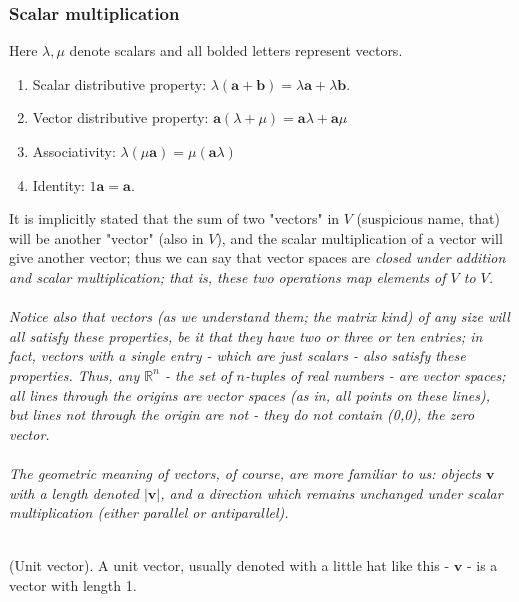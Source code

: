 \documentclass{article}
\begin{document}
\subsubsection*{Scalar multiplication}
Here $\lambda, \mu$ denote scalars and all bolded letters represent vectors.
\begin{enumerate}
    \item Scalar distributive property: $\lambda\mathbf{(a+b)}=\lambda\mathbf{a}+\lambda\mathbf{b}$.
    \item Vector distributive property: $\mathbf{a}(\lambda+\mu)=\mathbf{a}\lambda+\mathbf{a}\mu$
    \item Associativity: $\lambda(\mu\mathbf{a})=\mu(\mathbf{a}\lambda)$
    \item Identity: $1\mathbf{a}=\mathbf{a}$.
\end{enumerate}
It is implicitly stated that the sum of two "vectors" in $V$ (suspicious name, that) will be another "vector" (also in $V$), and the scalar multiplication of a vector will give another vector; thus we can say that vector spaces are \it closed under addition and scalar multiplication; \normalfont that is, these two operations map elements of $V$ to $V$. \\ \\Notice also that vectors (as we understand them; the matrix kind) of any size will all satisfy these properties, be it that they have two or three or ten entries; in fact, vectors with a single entry - which are just scalars - also satisfy these properties. Thus, any $\mathbb{R}^n$ - the set of $n$-tuples of real numbers - are vector spaces; all lines through the origins are vector spaces (as in, all points on these lines), but lines not through the origin are not - they do not contain (0,0), the zero vector.\\ \\
The geometric meaning of vectors, of course, are more familiar to us: objects $\mathbf{v}$ with a length denoted $|\mathbf{v}|$, and a direction which remains unchanged under scalar multiplication (either parallel or antiparallel).\\ \\
\begin{definition}
    (Unit vector). A unit vector, usually denoted with a little hat like this - $\mathbf{\hat{v}}$ - is a vector with length 1.
\end{definition}
\end{document}
